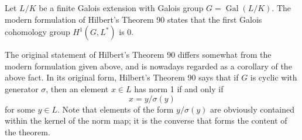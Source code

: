 \documentclass[12pt]{article}
\begin{document}
Let $L/K$ be a finite Galois extension with Galois group $G = \operatorname{Gal}(L/K)$. The modern formulation of Hilbert's Theorem 90 states that the first Galois cohomology group $H^1(G, L^*)$ is 0.

The original statement of Hilbert's Theorem 90 differs somewhat from the modern formulation given above, and is nowadays regarded as a corollary of the above fact. In its original form, Hilbert's Theorem 90 says that if $G$ is cyclic with generator $\sigma$, then an element $x \in L$ has norm 1 if and only if
$$
x = y/\sigma(y)
$$
for some $y \in L$. Note that elements of the form $y/\sigma(y)$ are obviously contained within the kernel of the norm map; it is the converse that forms the content of the theorem.
\end{document}
